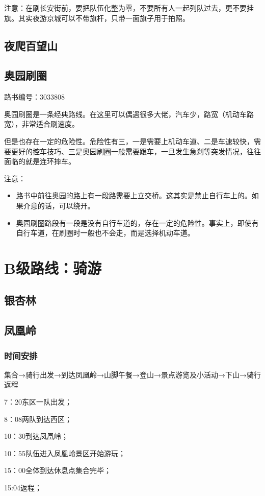 \documentclass{ctexbook}
\begin{document}
注意：在刷长安街前，要把队伍化整为零，不要所有人一起列队过去，更不要挂旗。其实夜游京城可以不带旗杆，只带一面旗子用于拍照。
\subsection{夜爬百望山}
\subsection{奥园刷圈}
路书编号：3033808 

奥园刷圈是一条经典路线。在这里可以偶遇很多大佬，汽车少，路宽（机动车路宽），非常适合刷速度。

但是也存在一定的危险性。危险性有三，一是需要上机动车道、二是车速较快，需要更好的控车技巧、三是奥园刷圈一般需要跟车，一旦发生急刹等突发情况，往往面临的就是连环摔车。

注意：

\begin{itemize}
    \item 路书中前往奥园的路上有一段路需要上立交桥。这其实是禁止自行车上的。如果介意的话，可以绕开。
    \item 奥园刷圈路段有一段是没有自行车道的，存在一定的危险性。事实上，即使有自行车道，在刷圈时一般也不会走，而是选择机动车道。
\end{itemize}

\section{B级路线：骑游}
\subsection{银杏林}
\subsection{凤凰岭}
\subsubsection{时间安排}
集合→骑行出发→到达凤凰岭→山脚午餐→登山→景点游览及小活动→下山→骑行返程

7：20东区一队出发；

8：08两队到达西区；

10：30到达凤凰岭；

10：55队伍进入凤凰岭景区开始游玩；

15：00全体到达休息点集合完毕；

15:04返程；
\end{document}
